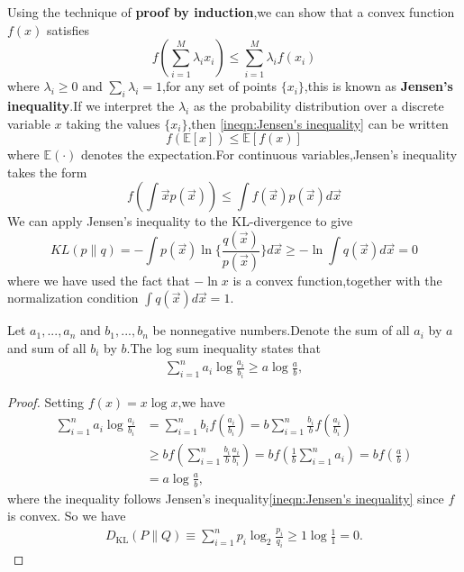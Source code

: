 Using the technique of \textbf{proof by induction},we can show that a convex function $f(x)$ satisfies 
\begin{equation}\label{ineqn:Jensen's inequality}
f(\sum_{i=1}^{M}\lambda_i x_i) \leq \sum_{i=1}^{M}\lambda_i f(x_i)
\end{equation}
where $\lambda_i \geq 0$ and $\sum_{i}\lambda_i = 1$,for any set of points $\{x_i\}$,this is known as \textbf{Jensen's inequality}.If we interpret the $\lambda_i$ as the probability distribution over a discrete variable $x$ taking the values $\{x_i\}$,then \ref{ineqn:Jensen's inequality} can be written
\begin{equation}
f(\mathbb{E}[x]) \leq \mathbb{E}[f(x)]
\end{equation}
where $\mathbb{E}(\cdot)$ denotes the expectation.For continuous variables,Jensen's inequality takes the form
\begin{equation}
f(\int \vec{x}p(\vec{x})) \leq \int f(\vec{x})p(\vec{x})d\vec{x}
\end{equation}
We can apply Jensen's inequality to the KL-divergence to give
\begin{equation}
KL(p\parallel q) = -\int p(\vec{x}) \ln\{\dfrac{q(\vec{x})}{p(\vec{x})}\}d\vec{x} \geq -\ln \int q(\vec{x})d\vec{x} = 0
\end{equation}
where we have used the fact that $-\ln x$ is a convex function,together with the normalization condition $\int q(\vec{x})d\vec{x} = 1$.
\begin{theorem}
	Let $a_1,...,a_n$ and $b_1,...,b_n$ be nonnegative numbers.Denote the sum of all $a_i$ by $a$ and sum of all $b_i$ by $b$.The log sum inequality states that
	\begin{align}
	\sum_{i=1}^n a_i\log\frac{a_i}{b_i}\geq a\log\frac{a}{b},
	\end{align}
\end{theorem}
\begin{proof}
	Setting $f(x) = x\log x$,we have
		\begin{align}
		\sum_{i=1}^n a_i\log\frac{a_i}{b_i} & {} = \sum_{i=1}^n b_i f\left(\frac{a_i}{b_i}\right)
		= b\sum_{i=1}^n \frac{b_i}{b} f\left(\frac{a_i}{b_i}\right) \\
		& {} \geq b f\left(\sum_{i=1}^n \frac{b_i}{b}\frac{a_i}{b_i}\right) = b f\left(\frac{1}{b}\sum_{i=1}^n a_i\right)
		= b f\left(\frac{a}{b}\right) \\
		& {} = a\log\frac{a}{b},
		\end{align}
where the inequality follows Jensen's inequality\ref{ineqn:Jensen's inequality} since $f$ is convex.
So we have
\begin{align}
D_{\mathrm{KL}}(P\|Q) \equiv \sum_{i=1}^n p_i \log_2 \frac{p_i}{q_i} \geq 1\log\frac{1}{1} = 0.
\end{align}
\end{proof}

